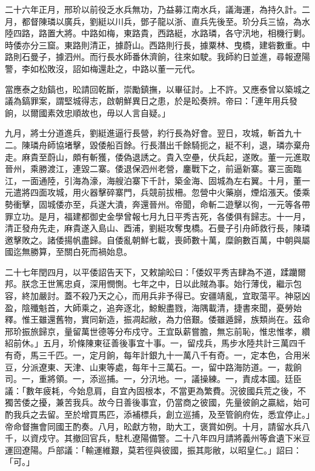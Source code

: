 \begin{pinyinscope}
二十六年正月，邢玠以前役乏水兵無功，乃益募江南水兵，議海運，為持久計。二月，都督陳璘以廣兵，劉綎以川兵，鄧子龍以浙、直兵先後至。玠分兵三協，為水陸四路，路置大將。中路如梅，東路貴，西路綎，水路璘，各守汛地，相機行剿。時倭亦分三窟。東路則清正，據蔚山。西路則行長，據粟林、曳橋，建砦數重。中路則石曼子，據泗州。而行長水師番休濟餉，往來如駛。我師約日並進，尋報遼陽警，李如松敗沒，詔如梅還赴之，中路以董一元代。

當應泰之劾鎬也，昖請回乾斷，崇勵鎮撫，以畢征討。上不許。又應泰曾以築城之議為鎬罪案，謂堅城得志，啟朝鮮異日之患，於是昖奏辨。帝曰：「連年用兵發餉，以爾國素效忠順故也，毋以人言自疑。」

九月，將士分道進兵，劉綎進逼行長營，約行長為好會。翌日，攻城，斬首九十二。陳璘舟師協堵擊，毀倭船百餘。行長潛出千餘騎扼之，綎不利，退，璘亦棄舟走。麻貴至蔚山，頗有斬獲，倭偽退誘之。貴入空壘，伏兵起，遂敗。董一元進取晉州，乘勝渡江，連毀二寨。倭退保泗州老營，鏖戰下之，前逼新寨。寨三面臨江，一面通陸，引海為濠，海艘泊寨下千計，築金海、固城為左右翼。十月，董一元遣將四面攻城，用火器擊碎寨門，兵競前拔柵。忽營中火藥崩，煙焰漲天。倭乘勢衝擊，固城倭亦至，兵遂大潰，奔還晉州。帝聞，命斬二遊擊以徇，一元等各帶罪立功。是月，福建都御史金學曾報七月九日平秀吉死，各倭俱有歸志。十一月，清正發舟先走，麻貴遂入島山、酉浦，劉綎攻奪曳橋。石曼子引舟師救行長，陳璘邀擊敗之。諸倭揚帆盡歸。自倭亂朝鮮七載，喪師數十萬，糜餉數百萬，中朝與屬國迄無勝算，至關白死而禍始息。

二十七年閏四月，以平倭詔告天下，又敕諭昖曰：「倭奴平秀吉肆為不道，蹂躪爾邦。朕念王世篤忠貞，深用憫惻。七年之中，日以此賊為事。始行薄伐，繼示包容，終加嚴討。蓋不殺乃天之心，而用兵非予得已。安疆靖亂，宜取蕩平。神惡凶盈，陰殲魁首，大師乘之，追奔逐北，鯨鯢盡戮，海隅載清，捷書來聞，憂勞始釋。惟王雖還舊物，實同新造，振凋起敝，為力倍艱。倭雖遁歸，族類尚在。茲命邢玠振旅歸京，量留萬世德等分布戍守。王宜臥薪嘗膽，無忘前恥，惟忠惟孝，纘紹前休。」五月，玠條陳東征善後事宜十事。一，留戍兵，馬步水陸共計三萬四千有奇，馬三千匹。一，定月餉，每年計銀九十一萬八千有奇。一，定本色，合用米豆，分派遼東、天津、山東等處，每年十三萬石。一，留中路海防道。一，裁餉司。一，重將領。一，添巡捕。一，分汛地。一，議操練。一，責成本國。廷臣議：「數年疲耗，今始息肩，自宜內固根本，不當更為繁費。況彼國兵荒之後，不獨苦倭之擾，兼苦我兵。故今日善後事宜，仍當商之彼國，先量彼餉之贏絀，始可酌我兵之去留。至於增買馬匹，添補標兵，創立巡捕，及至管餉府佐，悉宜停止。」帝命督撫會同國王酌奏。八月，昖獻方物，助大工，褒賞如例。十月，請留水兵八千，以資戍守。其撤回官兵，駐札遼陽備警。二十八年四月請將義州等倉遺下米豆運回遼陽。戶部議：「輸運維艱，莫若徑與彼國，振其彫敝，以昭皇仁。」詔曰：「可。」


\end{pinyinscope}
